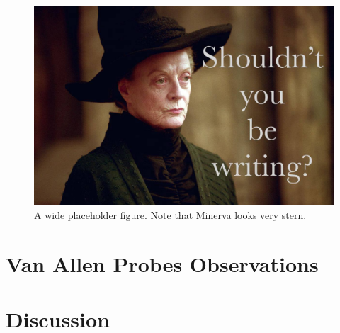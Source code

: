 \documentclass[jgrga]{agutex}
\begin{document}
\begin{article}
\lipsum[8-10]

\begin{figure}
\begin{center}
\includegraphics[width=\textwidth]{figures/placeholder.jpg}
\caption{A wide placeholder figure. Note that Minerva looks very stern. }
\label{fig_placeholder_wide}
\end{center}
\end{figure}

\lipsum[11-13]

\section{Van Allen Probes Observations}

\lipsum[14-16]

\section{Discussion}

\lipsum[17-19]




\end{article}

\begin{acknowledgments}
\end{acknowledgments}

\clearpage
\end{document}
